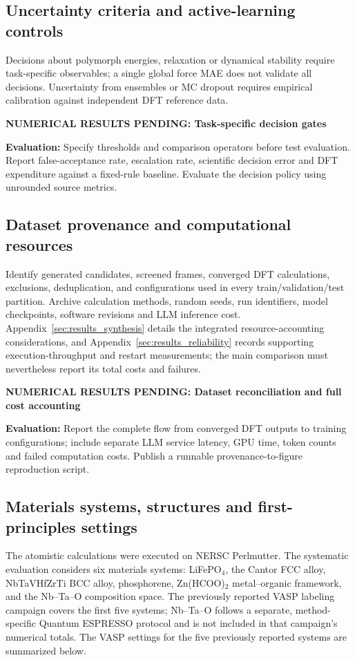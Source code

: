 \documentclass[11pt,a4paper]{article}
\newcommand{\newexperiment}[2]{\par\medskip\noindent\begingroup\color{red!80!black}\textbf{NUMERICAL RESULTS PENDING: #1}\par\noindent\textbf{Evaluation:} #2\par\endgroup\medskip}
\begin{document}
\subsection{Uncertainty criteria and active-learning controls}
Decisions about polymorph energies, relaxation or dynamical stability require task-specific observables; a single global force MAE does not validate all decisions. Uncertainty from ensembles or MC dropout requires empirical calibration against independent DFT reference data.
\newexperiment{Task-specific decision gates}{Specify thresholds and comparison operators before test evaluation. Report false-acceptance rate, escalation rate, scientific decision error and DFT expenditure against a fixed-rule baseline. Evaluate the decision policy using unrounded source metrics.}

\subsection{Dataset provenance and computational resources}
Identify generated candidates, screened frames, converged DFT calculations, exclusions, deduplication, and configurations used in every train/validation/test partition. Archive calculation methods, random seeds, run identifiers, model checkpoints, software revisions and LLM inference cost. Appendix~\ref{sec:results_synthesis} details the integrated resource-accounting considerations, and Appendix~\ref{sec:results_reliability} records supporting execution-throughput and restart measurements; the main comparison must nevertheless report its total costs and failures.
\newexperiment{Dataset reconciliation and full cost accounting}{Report the complete flow from converged DFT outputs to training configurations; include separate LLM service latency, GPU time, token counts and failed computation costs. Publish a runnable provenance-to-figure reproduction script.}
\subsection{Materials systems, structures and first-principles settings}
\label{sec:results:setup}
The atomistic calculations were executed on NERSC Perlmutter. The systematic evaluation considers six materials systems: LiFePO$_4$, the Cantor FCC alloy, NbTaVHfZrTi BCC alloy, phosphorene, Zn(HCOO)$_2$ metal--organic framework, and the Nb--Ta--O composition space. The previously reported VASP labeling campaign covers the first five systems; Nb--Ta--O follows a separate, method-specific Quantum ESPRESSO protocol and is not included in that campaign's numerical totals. The VASP settings for the five previously reported systems are summarized below.
\end{document}
